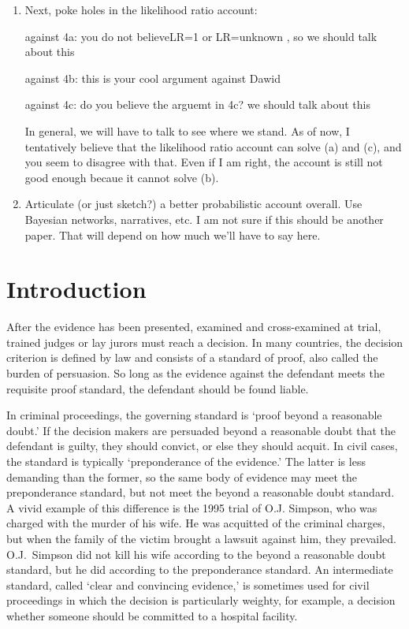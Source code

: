 \documentclass[10pt,dvipsnames,enabledeprecatedfontcommands]{scrartcl}
\begin{document}
\begin{enumerate}
\item Next, poke holes in the likelihood ratio account:

against 4a: you do not believeLR=1 or LR=unknown , so we should  talk about this

against 4b: this is your cool argument against Dawid

against 4c: do you believe the arguemt in 4c? we should talk about this 

In general, we will have to talk to see where we stand. As of now, I tentatively believe that the likelihood ratio account can solve (a) and (c), and you seem to disagree with that. Even if I am right, the account is still not good enough becaue it cannot solve (b).

\item Articulate (or just sketch?) a better probabilistic account overall. 
Use Bayesian networks, narratives, etc. I am not sure if this 
should be another paper. That will depend on how much we'll 
have to say here. 


\end{enumerate}

\tableofcontents

\section{Introduction}\label{introduction}

After the evidence has been presented, examined and cross-examined at
trial, trained judges or lay jurors must reach a decision. In many
countries, the decision criterion is defined by law and consists of a
standard of proof, also called the burden of persuasion. So long as the
evidence against the defendant meets the requisite proof standard, the
defendant should be found liable.

In criminal proceedings, the governing standard is `proof beyond a
reasonable doubt.' If the decision makers are persuaded beyond a
reasonable doubt that the defendant is guilty, they should convict, or
else they should acquit. In civil cases, the standard is typically
`preponderance of the evidence.' The latter is less demanding than the
former, so the same body of evidence may meet the preponderance
standard, but not meet the beyond a reasonable doubt standard. A vivid
example of this difference is the 1995 trial of O.J. Simpson, who was
charged with the murder of his wife. He was acquitted of the criminal
charges, but when the family of the victim brought a lawsuit against
him, they prevailed. O.J.~Simpson did not kill his wife according to the
beyond a reasonable doubt standard, but he did according to the
preponderance standard. An intermediate standard, called `clear and
convincing evidence,' is sometimes used for civil proceedings in which
the decision is particularly weighty, for example, a decision whether
someone should be committed to a hospital facility.
\end{document}
